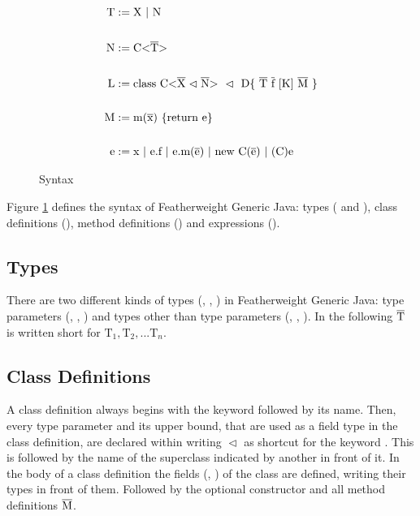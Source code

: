 \begin{figure}
    \begin{align*}
        \text{T} &:= \text{X} \ | \ \text{N}\\
        \\
        \text{N} &:= \text{C} \vv{\ot{T}}\\
        \\
        \text{L} &:= \text{class} \ \text{C} \xn \ \vartriangleleft \ \text{D} \{ \ \ot{T} \ \ot{f} \ [\text{K}] \ \ot{M} \ \}\\
        \\
        \text{M} &:= \text{m}(\ot{x}) \ \{\text{return e}\}\\
        \\
        \text{e} &:= \text{x} \ | \ \text{e.f} \ | \ \text{e.m(}\ot{e}\text{)} \ | \ \text{new C(}\ot{e}\text{)} \ | \ \text{(C)e}
    \end{align*}
    \caption{Syntax}
    \label{syntax}
\end{figure}

Figure \ref{syntax} defines the syntax of Featherweight Generic Java: types ( and ), class definitions (), method definitions () and expressions ().

\subsection{Types}

There are two different kinds of types (, , ) in Featherweight Generic Java:
type parameters (, , ) and types other than type parameters (, , ).
In the following $\overline{\text{T}}$ is written short for $\text{T}_1, \text{T}_2, ... \text{T}_n$.

\subsection{Class Definitions}

A class definition  always begins with the keyword  followed by its name. Then, every type parameter and its upper bound, that are used as a field type in the class definition, are declared within \inl{<>} writing $\vartriangleleft$ as shortcut for the keyword .
This is followed by the name of the superclass indicated by another  in front of it. In the body of a class definition the fields (, ) of the class are defined, writing their types in front of them. Followed by the optional constructor  and all method definitions $\overline{\text{M}}$.

